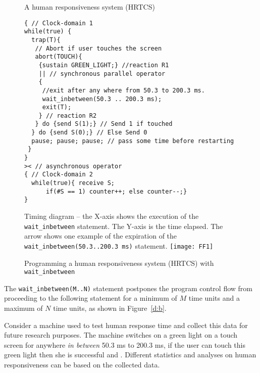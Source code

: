 \begin{figure}[t!]
	\vspace{-10pt}
        \begin{SubFloat}{\label{delay:a}A human responsiveness
            system (HRTCS)}
        \begin{lstlisting}[style=sysj,morekeywords={sustain,send,receive,abort,await,emit,present,trap,pause,exit,wait_inbetween,wait_exact,suspend}]
{ // Clock-domain 1
while(true) {
  trap(T){
   // Abort if user touches the screen
   abort(TOUCH){
    {sustain GREEN_LIGHT;} //reaction R1
    || // synchronous parallel operator
    {
     //exit after any where from 50.3 to 200.3 ms.
     wait_inbetween(50.3 .. 200.3 ms); 
     exit(T); 
    } // reaction R2
   } do {send S(1);} // Send 1 if touched 
  } do {send S(0);} // Else Send 0
  pause; pause; pause; // pass some time before restarting
 }
}
>< // asynchronous operator
{ // Clock-domain 2
  while(true){ receive S; 
      if(#S == 1) counter++; else counter--;}
}
\end{lstlisting}
\end{SubFloat}

\begin{SubFloat}{\label{d:b}Timing diagram -- the X-axis shows the
    execution of the \texttt{wait\_inbetween} statement. The Y-axis is
    the time elapsed. The arrow shows one example of the expiration of
    the \mbox{\texttt{wait\_inbetween(50.3..200.3 ms)}} statement.}
    \centering
    \texttt{[image: FF1]}
\end{SubFloat}
\caption{Programming a human responsiveness system (HRTCS) with
  \texttt{wait\_inbetween}}
\label{fig:1}
\end{figure}

The \texttt{wait\_inbetween(M..N)} statement postpones the program
control flow from proceeding to the following statement for a minimum of
$M$ time units and a maximum of $N$ time units, as shown in
Figure~\ref{d:b}.

Consider a machine used to test human response time and collect this
data for future research purposes. The machine switches on a green light
on a touch screen for anywhere \textit{in between} 50.3 ms to 200.3 ms,
if the user can touch this green light then she is successful and . Different statistics and analyses on human
responsiveness can be based on the collected data.

